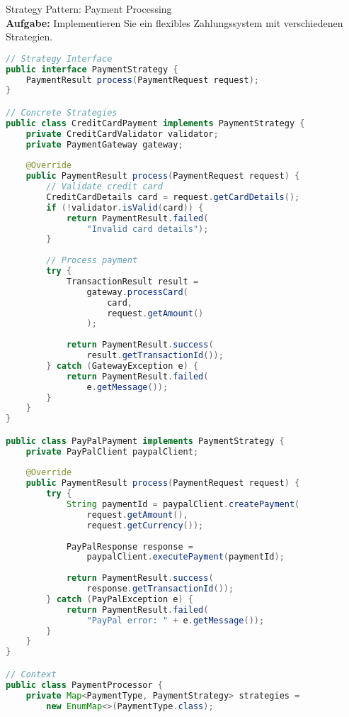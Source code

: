 \begin{example2}{Strategy Pattern: Payment Processing}\\
\textbf{Aufgabe:} Implementieren Sie ein flexibles Zahlungssystem mit verschiedenen Strategien.

\begin{lstlisting}[language=Java, style=basesmol]
// Strategy Interface
public interface PaymentStrategy {
    PaymentResult process(PaymentRequest request);
}

// Concrete Strategies
public class CreditCardPayment implements PaymentStrategy {
    private CreditCardValidator validator;
    private PaymentGateway gateway;
    
    @Override
    public PaymentResult process(PaymentRequest request) {
        // Validate credit card
        CreditCardDetails card = request.getCardDetails();
        if (!validator.isValid(card)) {
            return PaymentResult.failed(
                "Invalid card details");
        }
        
        // Process payment
        try {
            TransactionResult result = 
                gateway.processCard(
                    card,
                    request.getAmount()
                );
            
            return PaymentResult.success(
                result.getTransactionId());
        } catch (GatewayException e) {
            return PaymentResult.failed(
                e.getMessage());
        }
    }
}

public class PayPalPayment implements PaymentStrategy {
    private PayPalClient paypalClient;
    
    @Override
    public PaymentResult process(PaymentRequest request) {
        try {
            String paymentId = paypalClient.createPayment(
                request.getAmount(),
                request.getCurrency());
                
            PayPalResponse response = 
                paypalClient.executePayment(paymentId);
                
            return PaymentResult.success(
                response.getTransactionId());
        } catch (PayPalException e) {
            return PaymentResult.failed(
                "PayPal error: " + e.getMessage());
        }
    }
}

// Context
public class PaymentProcessor {
    private Map<PaymentType, PaymentStrategy> strategies = 
        new EnumMap<>(PaymentType.class);
        

\end{lstlisting}
\end{example2}
